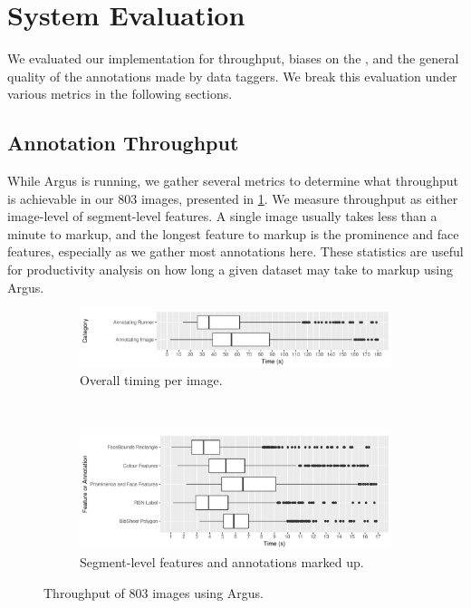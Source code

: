 \section{System Evaluation}

We evaluated our implementation for throughput, biases on the , and the general quality of the annotations made by data taggers. We break this evaluation under various metrics in the following sections.

\subsection{Annotation Throughput}
\label{sec:dataset:argus:metrics}

While Argus is running, we gather several metrics to determine what throughput is achievable in our 803 images, presented in  \cref{fig:dataset:argus:metrics:throughput}. We measure throughput as either image-level of segment-level features. A single image usually takes less than a minute to markup, and the longest feature to markup is the prominence and face features, especially as we gather most annotations here. These statistics are useful for productivity analysis on how long a given dataset may take to markup using Argus.

\begin{figure}[h]
  \begin{subfigure}[b]{\textwidth}
    \includegraphics[width=\textwidth]{images/dataset/argus/photo_box_plots}
    \caption{Overall timing per image.}   
  \end{subfigure}
  \smallskip
  \\
  \begin{subfigure}[b]{\textwidth}
    \includegraphics[width=\textwidth]{images/dataset/argus/feature_box_plots}
    \caption{Segment-level features and annotations marked up.}   
  \end{subfigure}
  \caption[Throughput of images using Argus]{Throughput of 803 images using Argus.}
  \label{fig:dataset:argus:metrics:throughput}
\end{figure}

